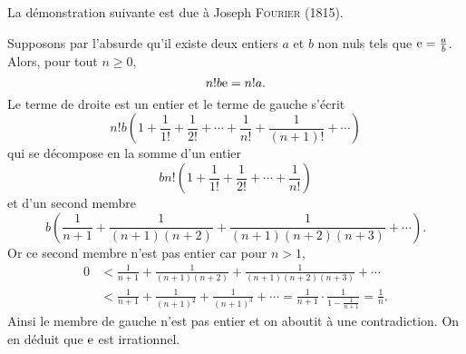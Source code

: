 La démonstration suivante est due à Joseph \textsc{Fourier} (1815).
\begin{preuve}
    Supposons par l'absurde qu'il existe deux entiers $a$ et $b$ non nuls tels que $\mathrm{e} = \frac{a}{b}$. Alors, pour tout $n \geqslant 0$,
    $$n! b \mathrm{e} = n! a.$$
    Le terme de droite est un entier et le terme de gauche s'écrit
    $$n! b \left(1 + \frac{1}{1!} + \frac{1}{2!} + \cdots + \frac{1}{n!} + \frac{1}{(n+1)!} + \cdots \right)$$
    qui se décompose en la somme d'un entier
    $$b n! \left(1 + \frac{1}{1!} + \frac{1}{2!} + \cdots + \frac{1}{n!} \right)$$
    et d'un second membre
    $$b \left( \frac{1}{n+1} + \frac{1}{(n+1)(n+2)} + \frac{1}{(n+1)(n+2)(n+3)}+ \cdots \right).$$
    Or ce second membre n'est pas entier car pour $n > 1$,
    \begin{align*}
        0 &< \frac{1}{n+1} + \frac{1}{(n+1)(n+2)} + \frac{1}{(n+1)(n+2)(n+3)} + \cdots \\
        & < \frac{1}{n+1} + \frac{1}{(n+1)^2} + \frac{1}{(n+1)^3} + \cdots = \frac{1}{n+1} \cdot \frac{1}{1-\frac{1}{n+1}} = \frac{1}{n}.
    \end{align*}
    Ainsi le membre de gauche n'est pas entier et on aboutit à une contradiction. On en déduit que $\mathrm{e}$ est irrationnel.
\end{preuve}

